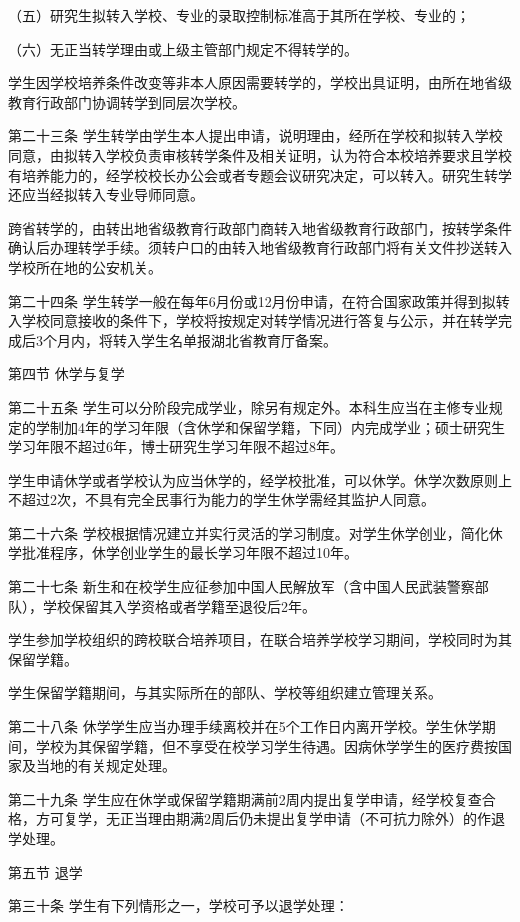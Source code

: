 \documentclass[UTF8,12pt,a4paper]{report}
\begin{document}
（五）研究生拟转入学校、专业的录取控制标准高于其所在学校、专业的；

（六）无正当转学理由或上级主管部门规定不得转学的。

学生因学校培养条件改变等非本人原因需要转学的，学校出具证明，由所在地省级教育行政部门协调转学到同层次学校。

第二十三条 学生转学由学生本人提出申请，说明理由，经所在学校和拟转入学校同意，由拟转入学校负责审核转学条件及相关证明，认为符合本校培养要求且学校有培养能力的，经学校校长办公会或者专题会议研究决定，可以转入。研究生转学还应当经拟转入专业导师同意。

跨省转学的，由转出地省级教育行政部门商转入地省级教育行政部门，按转学条件确认后办理转学手续。须转户口的由转入地省级教育行政部门将有关文件抄送转入学校所在地的公安机关。

第二十四条  学生转学一般在每年6月份或12月份申请，在符合国家政策并得到拟转入学校同意接收的条件下，学校将按规定对转学情况进行答复与公示，并在转学完成后3个月内，将转入学生名单报湖北省教育厅备案。

第四节 休学与复学

第二十五条 学生可以分阶段完成学业，除另有规定外。本科生应当在主修专业规定的学制加4年的学习年限（含休学和保留学籍，下同）内完成学业；硕士研究生学习年限不超过6年，博士研究生学习年限不超过8年。

   学生申请休学或者学校认为应当休学的，经学校批准，可以休学。休学次数原则上不超过2次，不具有完全民事行为能力的学生休学需经其监护人同意。

第二十六条 学校根据情况建立并实行灵活的学习制度。对学生休学创业，简化休学批准程序，休学创业学生的最长学习年限不超过10年。

第二十七条 新生和在校学生应征参加中国人民解放军（含中国人民武装警察部队），学校保留其入学资格或者学籍至退役后2年。

学生参加学校组织的跨校联合培养项目，在联合培养学校学习期间，学校同时为其保留学籍。

学生保留学籍期间，与其实际所在的部队、学校等组织建立管理关系。

第二十八条 休学学生应当办理手续离校并在5个工作日内离开学校。学生休学期间，学校为其保留学籍，但不享受在校学习学生待遇。因病休学学生的医疗费按国家及当地的有关规定处理。

第二十九条 学生应在休学或保留学籍期满前2周内提出复学申请，经学校复查合格，方可复学，无正当理由期满2周后仍未提出复学申请（不可抗力除外）的作退学处理。

第五节 退学

第三十条 学生有下列情形之一，学校可予以退学处理：
\end{document}
